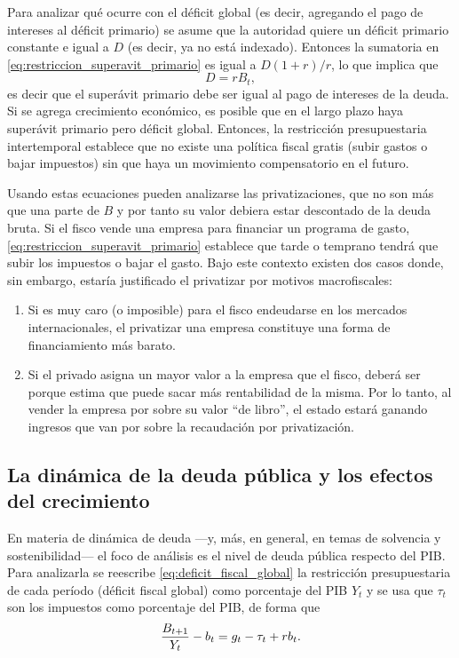 \documentclass[DeGregorioResumen]{subfiles}
\begin{document}
Para analizar qué ocurre con el déficit global (es decir, agregando el pago de intereses al déficit primario)  se asume que la autoridad quiere un déficit primario constante e igual a $D$ (es decir, ya no está indexado). Entonces la sumatoria en \eqref{eq:restriccion_superavit_primario} es igual a $D(1+r)/r$, lo que implica que
\begin{equation*}
D=rB_t,
\end{equation*}
es decir que el superávit primario debe ser igual al pago de intereses de la deuda. Si se agrega crecimiento económico, es posible que en el largo plazo haya superávit primario pero déficit global. Entonces, la restricción presupuestaria intertemporal establece que no existe una política fiscal gratis (subir gastos o bajar impuestos) sin que haya un movimiento compensatorio en el futuro.

Usando estas ecuaciones pueden analizarse las privatizaciones, que no son más que una parte de $B$ y por tanto su valor debiera estar descontado de la deuda bruta. Si el fisco vende una empresa para financiar un programa de gasto, \eqref{eq:restriccion_superavit_primario} establece que tarde o temprano tendrá que subir los impuestos o bajar el gasto. Bajo este contexto existen dos casos donde, sin embargo, estaría justificado el privatizar por motivos macrofiscales:

\begin{enumerate}
\item Si es muy caro (o imposible) para el fisco endeudarse en los mercados internacionales, el privatizar una empresa constituye una forma de financiamiento más barato.
\item Si el privado asigna un mayor valor a la empresa que el fisco, deberá ser porque estima que puede sacar más rentabilidad de la misma. Por lo tanto, al vender la empresa por sobre su valor ``de libro'', el estado estará ganando ingresos que van por sobre la recaudación por privatización.
\end{enumerate}

\subsection{La dinámica de la deuda pública y los efectos del crecimiento}

En materia de dinámica de deuda ---y, más, en general, en temas de solvencia y sostenibilidad--- el foco de análisis es el nivel de deuda pública respecto del PIB. Para analizarla se reescribe \eqref{eq:deficit_fiscal_global} la restricción presupuestaria de cada período (déficit fiscal global) como porcentaje del PIB $Y_t$ y se usa que $\tau_t $ son los impuestos como porcentaje del PIB, de forma que
\begin{equation*}
\frac{{B}_{t+1}}{Y_t}-b_t = g_t - \tau_t + rb_t.
\end{equation*}
\end{document}
